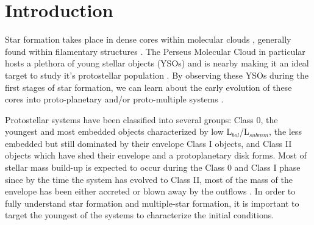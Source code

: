 \documentclass[preprint,12pt]{aastex62}
\newcommand{\htcn}{H$^{13}$CN}
\newcommand{\cso}{C$^{17}$O}
\newcommand{\lhtcn}{\htcn\space   (J = 4$\rightarrow$3)}   %
\newcommand{\lcso}{\cso\space    (J = 3$\rightarrow$2)}   %
\renewcommand{\micron}{$\mu$m}
\newcommand{\ab}{$\sim$}
\newcommand{\solm}{M$_{\odot}$}
\begin{document}
\begin{abstract}
We present ALMA observations towards a known compact ($<$500 AU separation) triple system, L1448 IRS3B, in Band 7 (879~\micron). We resolve spiral structures in dust continuum in the circum-multiple disk of IRS3B and detect the known wide (\ab2300 AU) companion, IRS3A, within these observations, also resolving possible spiral structure. Using dense gas tracers, \lcso\space and \lhtcn\space, we resolve disk kinematics for both the circum-triple structure and the wide companion with high fidelity.  Further, we use the empirical PV-data and radiative transfer modeling of the molecular line emission to confirm that the disks are in Keplerian rotation with mass estimates of 1.1\solm\space for IRS3B and 1.4\solm\space for IRS3A. Through the continuum models, we estimate the mass of the fragmenting disk of IRS3B to be \ab0.64\solm, indicating this disk is massive enough to be gravitationally unstable. By analyzing the Toomre~Q, we find the IRS3B disk is consistent with a gravitationally unstable disk between the radii \ab100~AU to 600~AU. The embedded tertiary companion, IRS3B-c, is likely \ab0.09\solm. While Toomre~Q analysis of IRS3A, whose disk is measured to be \ab0.08\solm, indicates this source is gravitationally stable.
\end{abstract}


\section{Introduction}
Star formation takes place in dense cores within molecular clouds \citep{1987ARAA..25...23S}, generally found within filamentary structures \citep{2014prpl.conf...27A}. The Perseus Molecular Cloud in particular hosts a plethora of young stellar objects (YSOs) and is nearby \citep[d\ab293 pc; e.g.][]{2018arXiv180803499O} making it an ideal target to study it's protostellar population \citep{2014ApJ...787L..18S,2009ApJ...692..973E}. By observing these YSOs during the first stages of star formation, we can learn about the early evolution of these cores into proto-planetary and/or proto-multiple systems \citep{2014prpl.conf..173L}.

Protostellar systems have been classified into several groups: Class 0, the youngest and most embedded objects characterized by low L$_{bol}$/L$_{submm}$, the less embedded but still dominated by their envelope Class I objects, and Class II objects which have shed their envelope and a protoplanetary disk forms. Most of stellar mass build-up is expected to occur during the Class 0 and Class I phase \citep[$<5\times$10$^{5}$yr; e.g.][]{2018arXiv180711262K,1987IAUS..115....1L} since by the time the system has evolved to Class II, most of the mass of the envelope has been either accreted or blown away by the outflows \citep{2006ApJ...646.1070A}. In order to fully understand star formation and multiple-star formation, it is important to target the youngest of the systems to characterize the initial conditions.
\end{document}
